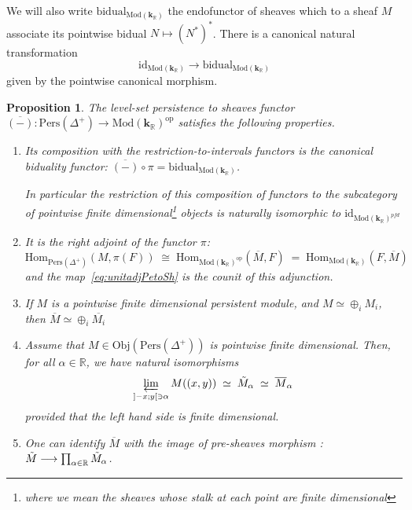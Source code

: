 \documentclass[a4paper, english, 11pt]{article}
\newcommand{\kk}[0]{\textbf{k}}
\newcommand{\Mod}[0]{\text{Mod}}
\newcommand{\Pe}{\text{Pers}}
\newcommand{\0}{\vec{0}}
\newcommand{\R}[0]{\mathbb{R}}
\newcommand{\Obj}[0]{\text{Obj}}
\newcommand{\op}[0]{\text{op}}
\newcommand{\Hom}[0]{\text{Hom}}
\newtheorem{prop}{Proposition}[section]
\begin{document}
We will also write $\text{bidual}_{\Mod(\kk_\R)}$ the endofunctor of  sheaves  which to a sheaf $M$ 
associate its pointwise bidual $N\mapsto (N^*)^*$. There is a canonical natural transformation 
\begin{equation}\label{eq:unitadjPetoSh} \text{id}_{\Mod(\kk_\R)} \longrightarrow \text{bidual}_{\Mod(\kk_\R)}\end{equation} given by the pointwise canonical morphism.
\begin{prop}\label{P:PropertiesofBar}
The level-set persistence to sheaves functor $\overline{(-)} : \Pe(\Delta^+)\longrightarrow \Mod (\kk_\R)^{\op}$ satisfies the following properties.
\begin{enumerate}
    \item Its composition  with the restriction-to-intervals functors is the canonical biduality functor: $\overline{(-)}\circ \pi = \text{bidual}_{\Mod(\kk_\R)}$. 
    
    In particular the restriction of this composition of functors to the subcategory of pointwise finite dimensional\footnote{where we mean the sheaves whose stalk at each point are finite dimensional} objects is naturally isomorphic to $\text{id}_{\Mod(\kk_\R)^{pfd}}$
    \item It is the right adjoint of the functor $\pi$: 
    $$\Hom_{\Pe(\Delta^+)}(M, \pi(F)) \; \cong \; \Hom_{\Mod(\kk_\R)^{\op}}(\overline{M}, F)\; = \; \Hom_{\Mod(\kk_\R)}(F,\overline{M}) $$ and the map~\eqref{eq:unitadjPetoSh} is the counit of this adjunction.
    \item If $M$ is a pointwise finite dimensional persistent module, and $M \simeq \oplus_i M_i$, then $\overline{M} \simeq \oplus_i \overline{M_i} $
    \item Assume that $M \in \Obj(\Pe(\Delta^{+}))$ is pointwise finite dimensional. Then, for all $\alpha \in \R$, we have natural isomorphisms  $$ \varprojlim_{]-x;y[\ni \alpha}M((x,y)) \;\simeq\; \tilde{M}_{\alpha}\; \simeq \; \overline{M}_{\alpha}$$ provided that the left hand side is finite dimensional.
    
    \item One can identify $\overline{M}$ with the image of  pre-sheaves morphism : $\Tilde{M}\longrightarrow \prod_{\alpha\in\R}\Tilde{M}_{\alpha} $.
\end{enumerate}
\end{prop}
\end{document}
